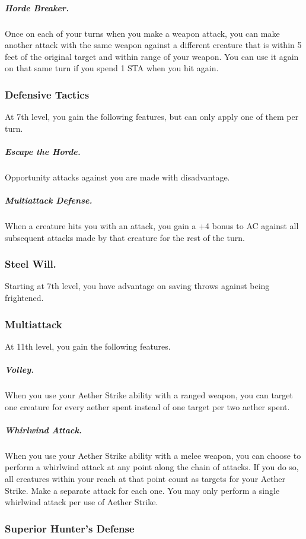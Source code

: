 \subparagraph*{Horde Breaker.} Once on each of your turns when you make a weapon attack, you can make another attack with the same weapon against a different creature that is within 5 feet of the original target and within range of your weapon. You can use it again on that same turn if you spend 1 STA when you hit again.

\subsubsection{Defensive Tactics}

At 7th level, you gain the following features, but can only apply one of them per turn.

\subparagraph*{Escape the Horde.} Opportunity attacks against you are made with disadvantage.

\subparagraph*{Multiattack Defense.} When a creature hits you with an attack, you gain a +4 bonus to AC against all subsequent attacks made by that creature for the rest of the turn.

\subsubsection{Steel Will.} Starting at 7th level, you have advantage on saving throws against being frightened.

\subsubsection{Multiattack}

At 11th level, you gain the following features.

\subparagraph*{Volley.} When you use your Aether Strike ability with a ranged weapon, you can target one creature for every aether spent instead of one target per two aether spent.

\subparagraph*{Whirlwind Attack.} When you use your Aether Strike ability with a melee weapon, you can choose to perform a whirlwind attack at any point along the chain of attacks. If you do so, all creatures within your reach at that point count as targets for your Aether Strike. Make a separate attack for each one. You may only perform a single whirlwind attack per use of Aether Strike.

\subsubsection{Superior Hunter's Defense}

